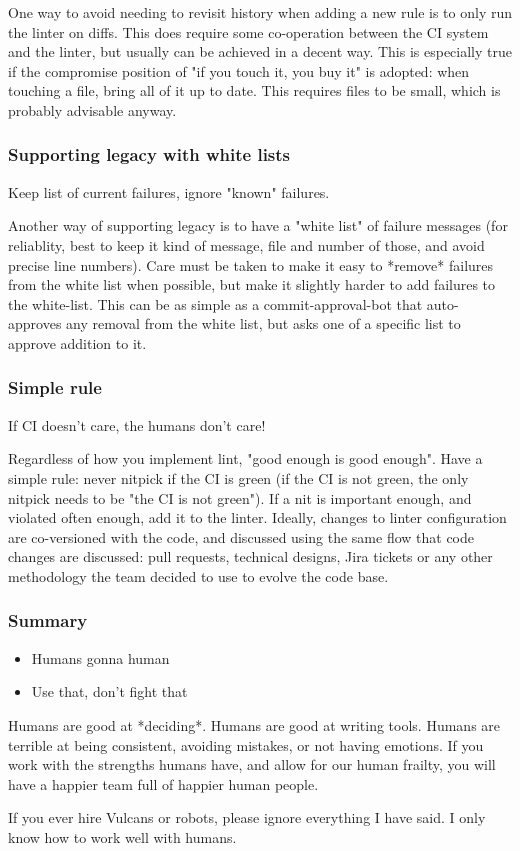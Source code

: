One way to avoid needing to revisit history when adding a new rule
is to only run the linter on diffs.
This does require some co-operation between the CI system
and the linter,
but usually can be achieved in a decent way.
This is especially true if the compromise position of
"if you touch it, you buy it"
is adopted:
when touching a file,
bring all of it up to date.
This requires files to be small,
which is probably advisable anyway.

\begin{frame}
\frametitle{Supporting legacy with white lists}
Keep list of current failures,
ignore "known" failures.
\end{frame}

Another way of supporting legacy is to have a "white list"
of failure messages
(for reliablity,
best to keep it kind of message, file and number of those,
and avoid precise line numbers).
Care must be taken to make it easy to *remove* failures
from the white list when possible,
but make it slightly harder to add failures to the white-list.
This can be as simple as a commit-approval-bot that
auto-approves any removal from the white list,
but asks one of a specific list to approve addition to it.

\begin{frame}
\frametitle{Simple rule}
If CI doesn't care,
the humans don't care!
\end{frame}

Regardless of how you implement lint,
"good enough is good enough".
Have a simple rule:
never nitpick if the CI is green
(if the CI is not green,
the only nitpick needs to be
"the CI is not green").
If a nit is important enough,
and violated often enough,
add it to the linter.
Ideally, changes to linter configuration are co-versioned
with the code,
and discussed using the same flow that code changes are discussed:
pull requests,
technical designs,
Jira tickets
or any other methodology the team decided to use to evolve the code base.

\begin{frame}
\frametitle{Summary}
\begin{itemize}
\item Humans gonna human
\item Use that, don't fight that
\end{itemize}
\end{frame}

Humans are good at *deciding*.
Humans are good at writing tools.
Humans are terrible at being consistent,
avoiding mistakes,
or  not having emotions.
If you work with the strengths humans have,
and allow for our human frailty,
you will have a happier team
full of happier human people.

If you ever hire Vulcans or robots,
please ignore everything I have said.
I only know how to work well with humans.


